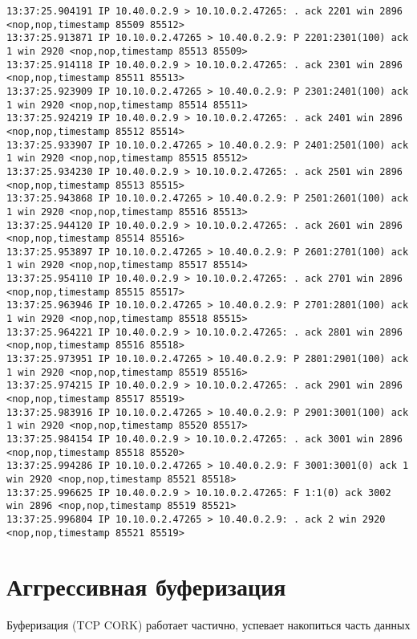 \documentclass[a4paper,12pt]{article}
\begin{document}
\begin{lstlisting}
13:37:25.904191 IP 10.40.0.2.9 > 10.10.0.2.47265: . ack 2201 win 2896 <nop,nop,timestamp 85509 85512>
13:37:25.913871 IP 10.10.0.2.47265 > 10.40.0.2.9: P 2201:2301(100) ack 1 win 2920 <nop,nop,timestamp 85513 85509>
13:37:25.914118 IP 10.40.0.2.9 > 10.10.0.2.47265: . ack 2301 win 2896 <nop,nop,timestamp 85511 85513>
13:37:25.923909 IP 10.10.0.2.47265 > 10.40.0.2.9: P 2301:2401(100) ack 1 win 2920 <nop,nop,timestamp 85514 85511>
13:37:25.924219 IP 10.40.0.2.9 > 10.10.0.2.47265: . ack 2401 win 2896 <nop,nop,timestamp 85512 85514>
13:37:25.933907 IP 10.10.0.2.47265 > 10.40.0.2.9: P 2401:2501(100) ack 1 win 2920 <nop,nop,timestamp 85515 85512>
13:37:25.934230 IP 10.40.0.2.9 > 10.10.0.2.47265: . ack 2501 win 2896 <nop,nop,timestamp 85513 85515>
13:37:25.943868 IP 10.10.0.2.47265 > 10.40.0.2.9: P 2501:2601(100) ack 1 win 2920 <nop,nop,timestamp 85516 85513>
13:37:25.944120 IP 10.40.0.2.9 > 10.10.0.2.47265: . ack 2601 win 2896 <nop,nop,timestamp 85514 85516>
13:37:25.953897 IP 10.10.0.2.47265 > 10.40.0.2.9: P 2601:2701(100) ack 1 win 2920 <nop,nop,timestamp 85517 85514>
13:37:25.954110 IP 10.40.0.2.9 > 10.10.0.2.47265: . ack 2701 win 2896 <nop,nop,timestamp 85515 85517>
13:37:25.963946 IP 10.10.0.2.47265 > 10.40.0.2.9: P 2701:2801(100) ack 1 win 2920 <nop,nop,timestamp 85518 85515>
13:37:25.964221 IP 10.40.0.2.9 > 10.10.0.2.47265: . ack 2801 win 2896 <nop,nop,timestamp 85516 85518>
13:37:25.973951 IP 10.10.0.2.47265 > 10.40.0.2.9: P 2801:2901(100) ack 1 win 2920 <nop,nop,timestamp 85519 85516>
13:37:25.974215 IP 10.40.0.2.9 > 10.10.0.2.47265: . ack 2901 win 2896 <nop,nop,timestamp 85517 85519>
13:37:25.983916 IP 10.10.0.2.47265 > 10.40.0.2.9: P 2901:3001(100) ack 1 win 2920 <nop,nop,timestamp 85520 85517>
13:37:25.984154 IP 10.40.0.2.9 > 10.10.0.2.47265: . ack 3001 win 2896 <nop,nop,timestamp 85518 85520>
13:37:25.994286 IP 10.10.0.2.47265 > 10.40.0.2.9: F 3001:3001(0) ack 1 win 2920 <nop,nop,timestamp 85521 85518>
13:37:25.996625 IP 10.40.0.2.9 > 10.10.0.2.47265: F 1:1(0) ack 3002 win 2896 <nop,nop,timestamp 85519 85521>
13:37:25.996804 IP 10.10.0.2.47265 > 10.40.0.2.9: . ack 2 win 2920 <nop,nop,timestamp 85521 85519>
\end{lstlisting}

\section{Аггрессивная буферизация}

Буферизация (TCP CORK) работает частично, успевает накопиться часть данных
\end{document}
